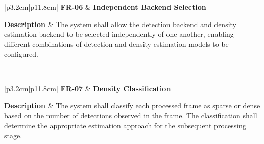 
\begin{table}[H]
	\centering
	\renewcommand{\arraystretch}{1.25}
	\begin{tabular}{|p{3.2cm}|p{11.8cm}|}
		\hline
		\textbf{FR-06} &
		\textbf{Independent Backend Selection} \\ \hline
		
		\textbf{Description} &
		The system shall allow the detection backend and density estimation backend to be selected independently of one another, enabling different combinations of detection and density estimation models to be configured. \\ \hline
		
		 \\ \hline
	\end{tabular}
	\caption{Functional requirement for independent backend selection.}
	\label{tab:fr06}
\end{table}



\begin{table}[H]
	\centering
	\renewcommand{\arraystretch}{1.25}
	\begin{tabular}{|p{3.2cm}|p{11.8cm}|}
		\hline
		\textbf{FR-07} &
		\textbf{Density Classification} \\ \hline
		
		\textbf{Description} &
		The system shall classify each processed frame as sparse or dense based on the number of detections observed in the frame. The classification shall determine the appropriate estimation approach for the subsequent processing stage. \\ \hline
		
		 \\ \hline
	\end{tabular}
	\caption{Functional requirement for density classification.}
	\label{tab:fr07}
\end{table}


